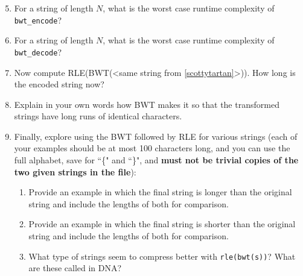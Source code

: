 \begin{enumerate}
\setcounter{enumii}{4}
  \item \label{encode_rutime}For a string of length $N$, what is the worst case runtime complexity of \texttt{bwt\_encode}?
  \begin{solution}
  \end{solution}
  \item \label{decode_runtime}For a string of length $N$, what is the worst case runtime complexity of \texttt{bwt\_decode}?
  \begin{solution}
  \end{solution}
  \item Now compute RLE(BWT(<same string from \ref{scottytartan}>)). How long is the encoded string now?
  \begin{solution}
  \end{solution}
  \item Explain in your own words how BWT makes it so that the transformed strings have long runs of identical characters.
  \begin{solution}
  \end{solution}
  \item Finally, explore using the BWT followed by RLE for various strings (each of your examples should be at most 100 characters long, and you can use the full alphabet, save for ``\{" and ``\}", and \textbf{must not be trivial copies of the two given strings in the file}):
  \begin{enumerate}
      \item Provide an example in which the final string is longer than the original string and include the lengths of both for comparison.
      \begin{solution}
      \end{solution}
      \item Provide an example in which the final string is shorter than the original string and include the lengths of both for comparison.
      \begin{solution}
      \end{solution}
      \item What type of strings seem to compress better with \texttt{rle(bwt(s))}? What are these called in DNA?
      \begin{solution}
      \end{solution}
  \end{enumerate}
\end{enumerate}

